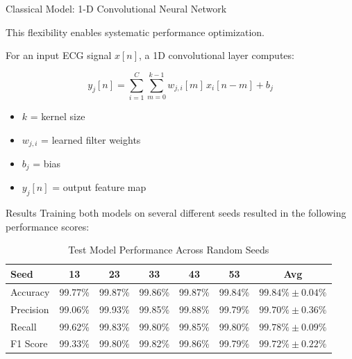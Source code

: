 \documentclass[final]{beamer}
\newlength{\colwidth}
\begin{document}
\begin{frame}[t]
\begin{columns}[t]
\begin{column}{\colwidth}
\begin{block}{Classical Model: 1-D Convolutional Neural Network}
					\bigskip
						
					This flexibility enables systematic performance optimization.	
					
					\bigskip
					
					For an input ECG signal $x[n]$, a 1D convolutional layer computes:
					
					\[
					y_j[n] = \sum_{i=1}^{C} \sum_{m=0}^{k-1} w_{j,i}[m] \, x_i[n-m] + b_j
					\]	
						
						
					\smallskip
						
					
					\begin{itemize}
						\item $k$ = kernel size
						\item $w_{j,i}$ = learned filter weights
						\item $b_j$ = bias
						\item $y_j[n]$ = output feature map
					\end{itemize}
					
					\smallskip
					
				
				\end{block}
				
				\begin{exampleblock}{Results}
					Training both models on several different seeds resulted in the following performance scores:
					\begin{table}[h]

						\bigskip
						
						\centering
						\caption{Test Model Performance Across Random Seeds}
						\label{tab:test_model}
						\begin{tabular}{lcccccc}
							\hline
							Seed & 13 & 23 & 33 & 43 & 53 & Avg \\ 
							\hline
							Accuracy  & 99.77\% & 99.87\% & 99.86\% & 99.87\% & 99.84\% & $99.84\%\pm0.04\%$ \\
							Precision & 99.06\% & 99.93\% & 99.85\% & 99.88\% & 99.79\% & $99.70\%\pm0.36\%$ \\
							Recall    & 99.62\% & 99.83\% & 99.80\% & 99.85\% & 99.80\% & $99.78\%\pm0.09\%$ \\
							F1 Score  & 99.33\% & 99.80\% & 99.82\% & 99.86\% & 99.79\% & $99.72\%\pm0.22\%$ \\
							\hline
						\end{tabular}
						
					\end{table}
					

\end{exampleblock}
\end{column}
\end{columns}
\end{frame}
\end{document}

